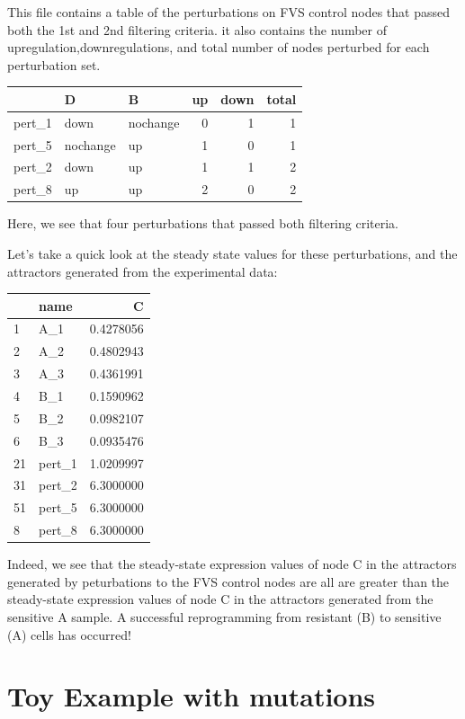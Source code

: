 \documentclass[
]{book}
\theoremstyle{definition}
\theoremstyle{definition}
\theoremstyle{definition}
\theoremstyle{definition}
\theoremstyle{remark}
\begin{document}
This file contains a table of the perturbations on FVS control nodes that passed both the 1st and 2nd filtering criteria. it also contains the number of upregulation,downregulations, and total number of nodes perturbed for each perturbation set.

\begin{tabular}{l|l|l|r|r|r}
\hline
  & D & B & up & down & total\\
\hline
pert\_1 & down & nochange & 0 & 1 & 1\\
\hline
pert\_5 & nochange & up & 1 & 0 & 1\\
\hline
pert\_2 & down & up & 1 & 1 & 2\\
\hline
pert\_8 & up & up & 2 & 0 & 2\\
\hline
\end{tabular}

Here, we see that four perturbations that passed both filtering criteria.

Let's take a quick look at the steady state values for these perturbations, and the attractors generated from the experimental data:

\begin{tabular}{l|l|r}
\hline
  & name & C\\
\hline
1 & A\_1 & 0.4278056\\
\hline
2 & A\_2 & 0.4802943\\
\hline
3 & A\_3 & 0.4361991\\
\hline
4 & B\_1 & 0.1590962\\
\hline
5 & B\_2 & 0.0982107\\
\hline
6 & B\_3 & 0.0935476\\
\hline
21 & pert\_1 & 1.0209997\\
\hline
31 & pert\_2 & 6.3000000\\
\hline
51 & pert\_5 & 6.3000000\\
\hline
8 & pert\_8 & 6.3000000\\
\hline
\end{tabular}

Indeed, we see that the steady-state expression values of node C in the attractors generated by peturbations to the FVS control nodes are all are greater than the steady-state expression values of node C in the attractors generated from the sensitive A sample. A successful reprogramming from resistant (B) to sensitive (A) cells has occurred!

\hypertarget{toy-example-with-mutations}{%
\section{Toy Example with mutations}\label{toy-example-with-mutations}}
\end{document}
